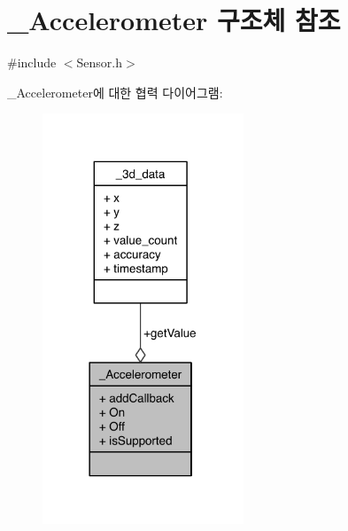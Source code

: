 \hypertarget{struct___accelerometer}{\section{\-\_\-\-Accelerometer 구조체 참조}
\label{struct___accelerometer}
}


{\ttfamily \#include $<$Sensor.\-h$>$}



\-\_\-\-Accelerometer에 대한 협력 다이어그램\-:
\nopagebreak
\begin{figure}[H]
\begin{center}
\leavevmode
\includegraphics[width=170pt]{dc/d9a/struct___accelerometer__coll__graph}
\end{center}
\end{figure}
